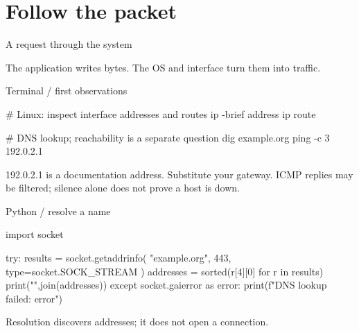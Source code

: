 \documentclass[aspectratio=\DemoAspect,10pt]{beamer}
\begin{document}
\section{Follow the packet}
{
}
\begin{frame}{A request through the system}
  \centering
  \par\vspace{.4cm}
  \YTwoKSeparator
  {\small The application writes bytes. The OS and interface turn them into traffic.}
\end{frame}
\begin{frame}[fragile]{Terminal / first observations}
  \begin{YTwoKCode}[language=bash,numbers=none]
# Linux: inspect interface addresses and routes
ip -brief address
ip route

# DNS lookup; reachability is a separate question
dig example.org
ping -c 3 192.0.2.1
  \end{YTwoKCode}
  \vspace{.2cm}
  {\small\color{y2kMuted}192.0.2.1 is a documentation address. Substitute your gateway.
  ICMP replies may be filtered; silence alone does not prove a host is down.}
\end{frame}
\begin{frame}[fragile]{Python / resolve a name}
  \begin{YTwoKCode}[language=Python]
import socket

try:
    results = socket.getaddrinfo(
        "example.org", 443, type=socket.SOCK_STREAM
    )
    addresses = sorted({r[4][0] for r in results})
    print("\n".join(addresses))
except socket.gaierror as error:
    print(f"DNS lookup failed: {error}")
  \end{YTwoKCode}
  \vspace{.2cm}
  {\small Resolution discovers addresses; it does not open a connection.}
\end{frame}
\end{document}
